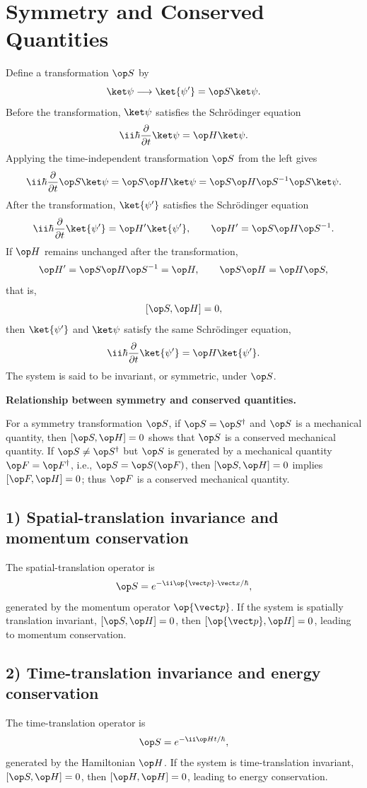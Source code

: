 \section{Symmetry and Conserved Quantities}
Define a transformation $\op S$ by
\[\ket\psi\longrightarrow\ket{\psi'}=\op S\ket\psi.\]
Before the transformation, $\ket\psi$ satisfies the Schr\"odinger equation
\[\ii\hbar\frac{\partial}{\partial t}\ket\psi=\op H\ket\psi.\]
Applying the time-independent transformation $\op S$ from the left gives
\[\ii\hbar\frac{\partial}{\partial t}\op S\ket\psi
=\op S\op H\ket\psi
=\op S\op H\op S^{-1}\op S\ket\psi.\]
After the transformation, $\ket{\psi'}$ satisfies the Schr\"odinger equation
\[\ii\hbar\frac{\partial}{\partial t}\ket{\psi'}
=\op H'\ket{\psi'},\qquad
\op H'=\op S\op H\op S^{-1}.\]
If $\op H$ remains unchanged after the transformation,
\[\op H'=\op S\op H\op S^{-1}=\op H,
\qquad\op S\op H=\op H\op S,\]
that is,
\[[\op S,\op H]=0,\]
then $\ket{\psi'}$ and $\ket\psi$ satisfy the same Schr\"odinger equation,
\[\ii\hbar\frac{\partial}{\partial t}\ket{\psi'}
=\op H\ket{\psi'}.\]
The system is said to be invariant, or symmetric, under $\op S$.

\textbf{Relationship between symmetry and conserved quantities.}

For a symmetry transformation $\op S$, if $\op S=\op S^{\dagger}$ and $\op S$ is a mechanical quantity, then $[\op S,\op H]=0$ shows that $\op S$ is a conserved mechanical quantity. If $\op S\ne\op S^{\dagger}$ but $\op S$ is generated by a mechanical quantity $\op F=\op F^{\dagger}$, i.e., $\op S=\op S(\op F)$, then $[\op S,\op H]=0$ implies $[\op F,\op H]=0$; thus $\op F$ is a conserved mechanical quantity.

\subsection*{1) Spatial-translation invariance and momentum conservation}
The spatial-translation operator is
\[\op S=e^{-\ii\op{\vect p}\cdot\vect x/\hbar},\]
generated by the momentum operator $\op{\vect p}$. If the system is spatially translation invariant, $[\op S,\op H]=0$, then $[\op{\vect p},\op H]=0$, leading to momentum conservation.

\subsection*{2) Time-translation invariance and energy conservation}
The time-translation operator is
\[\op S=e^{-\ii\op Ht/\hbar},\]
generated by the Hamiltonian $\op H$. If the system is time-translation invariant, $[\op S,\op H]=0$, then $[\op H,\op H]=0$, leading to energy conservation.

